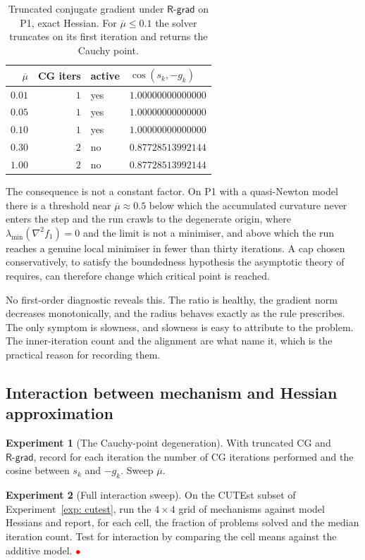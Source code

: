 \documentclass[11pt]{article}
\theoremstyle{plain}
\theoremstyle{definition}
\newtheorem{experiment}{Experiment}
\theoremstyle{remark}
\numberwithin{equation}{section}
\newcommand{\Rgrad}{\textsf{R-grad}}
\newcommand{\placeholder}{\textcolor{red}{$\bullet$}}
\begin{document}
\begin{table}[htbp]
  \centering
  \caption{Truncated conjugate gradient under $\Rgrad$ on P1, exact
           Hessian.\provisional{} For $\overline{\mu} \leq 0.1$ the solver
           truncates on its first iteration and returns the Cauchy point.}
  \label{tab: cauchy}
  \small
  \begin{tabular}{@{}rrll@{}}
    \toprule
    $\overline{\mu}$ & CG iters & active & $\cos(s_k,-g_k)$ \\
    \midrule
    $0.01$ & $1$ & yes & $1.00000000000000$ \\
    $0.05$ & $1$ & yes & $1.00000000000000$ \\
    $0.10$ & $1$ & yes & $1.00000000000000$ \\
    $0.30$ & $2$ & no  & $0.87728513992144$ \\
    $1.00$ & $2$ & no  & $0.87728513992144$ \\
    \bottomrule
  \end{tabular}
\end{table}

The consequence is not a constant factor. On P1 with a quasi-Newton model there
is a threshold near $\overline{\mu} \approx 0.5$ below which the accumulated
curvature never enters the step and the run crawls to the degenerate origin,
where $\lambda_{\min}(\nabla^2 f_1) = 0$ and the limit is not a minimiser, and
above which the run reaches a genuine local minimiser in fewer than thirty
iterations.\provisional{} A cap chosen conservatively, to satisfy the
boundedness hypothesis the asymptotic theory of \PartII{} requires, can therefore
change which critical point is reached.

No first-order diagnostic reveals this. The ratio is healthy, the gradient norm
decreases monotonically, and the radius behaves exactly as the rule prescribes.
The only symptom is slowness, and slowness is easy to attribute to the problem.
The inner-iteration count and the alignment are what name it, which is the
practical reason for recording them.


\subsection{Interaction between mechanism and Hessian approximation}
\label{sec: exp interaction}

\begin{experiment}[The Cauchy-point degeneration]
\label{exp: interaction}
With truncated CG and $\Rgrad$, record for each iteration the number of CG iterations performed
and the cosine between $s_k$ and $-g_k$. Sweep $\overline{\mu}$.
\end{experiment}
\begin{experiment}[Full interaction sweep]
\label{exp: interaction full}
On the CUTEst subset of Experiment~\ref{exp: cutest}, run the $4 \times 4$ grid of mechanisms
against model Hessians and report, for each cell, the fraction of problems solved and the
median iteration count. Test for interaction by comparing the cell means against the additive
model. \placeholder
\end{experiment}
\end{document}
